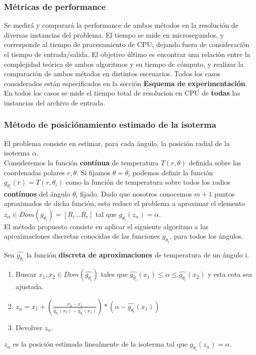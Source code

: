 \subsubsection{Métricas de performance}

Se medir\'a y comparar\'a la performance de ambos m\'etodos en la resoluci\'on de diversas instancias del problema. El tiempo se mide en microsegundos, y corresponde al tiempo de procesamiento de CPU, dejando fuera de consideraci\'on el tiempo de entrada/salida. El objetivo \'ultimo es encontrar una relaci\'on entre la complejidad te\'orica de ambos algoritmos y su tiempo de c\'omputo, y realizar la comparaci\'on de ambos m\'etodos en distintos escenarios. Todos los casos considerados est\'an especificados en la secci\'on \textbf{Esquema de experimentaci\'on}. En todos los casos se mide el tiempo total de resolucion en CPU de \textbf{todas} las instancias del archivo de entrada.

\subsubsection{Método de posiciónamiento estimado de la isoterma}
El problema consiste en estimar, para cada ángulo, la posición radial de la isoterma \texttt{$\alpha$}.\\
Consideremos la función \textbf{contínua} de temperatura $T(r,\theta)$ definida sobre las coordenadas polares $r,\theta$. Si fijamos $\theta = \theta_i$ podemos definir la función $g_{\theta_i}(r) = T(r,\theta_i)$ como la función de temperatura sobre todos los radios \textbf{contínuos} del ángulo $\theta_i$ fijado. Dado que nosotros conocemos $m+1$ puntos aproximados de dicha función, esto reduce el problema a aproximar el elemento $ z_\alpha \in Dom(g_{\theta_i}) = { [R_i \dots R_e] }$ tal que $g_{\theta_i}(z_\alpha) = \alpha$. \\
El método propuesto consiste en aplicar el siguiente algoritmo a las aproximaciones discretas conocidas de las funciones $g_{\theta_i}$, para todos los ángulos.

\begin{proposition}
    Sea $\hat{g_{\theta_i}}$ la función \textbf{discreta de aproximaciones} de temperatura de un ángulo i.
    \begin{enumerate}
        \item Buscar $ x_1, x_2 \in Dom(\hat{g_{\theta_i}}) $ tales que $ \hat{g_{\theta_i}}(x_1) \leq \alpha \leq \hat{g_{\theta_i}}(x_2)$ y esta cota sea ajustada.
        
        \item $z_\alpha = x_1 + \left(\frac{x_2 - x_1}{\hat{g_{\theta_i}}(x_2) - \hat{g_{\theta_i}}(x_1)}\right) * (\alpha - \hat{g_{\theta_i}}(x_1))$

        \item Devolver $z_\alpha$.
    \end{enumerate}
    $z_\alpha$ es la posición estimada linealmente de la isoterma tal que $g_{\theta_i}(z_\alpha) = \alpha$.
\end{proposition}

